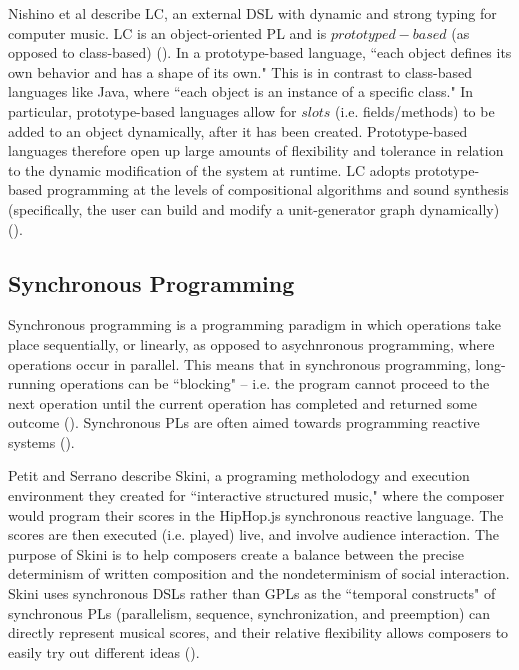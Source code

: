 \documentclass{report}
\newcommand\citeparen[1]{(\cite{#1})}
\begin{document}
Nishino et al describe LC, an  external DSL with dynamic and strong typing for computer music. LC is  an object-oriented PL and is $prototyped-based$ (as opposed  to  class-based) \citeparen{nishino_osaka_nakatsu_2013}. In a prototype-based language, ``each object defines its own behavior and has a shape of its own." This is in contrast to class-based languages like Java, where ``each object is an instance of a specific class." In particular, prototype-based languages allow for $slots$ (i.e. fields/methods)  to be  added  to an  object  dynamically, after it  has been  created. Prototype-based languages therefore open up large amounts of flexibility and tolerance  in relation to the dynamic modification of the system at runtime. LC adopts prototype-based programming at the levels of compositional algorithms  and sound synthesis (specifically, the user can build and modify a unit-generator graph dynamically) \citeparen{nishino_osaka_nakatsu_2014}.

\subsection{Synchronous Programming}
\label{sec:synchronous}
Synchronous  programming is a programming paradigm in which operations take  place  sequentially, or linearly, as opposed to asychnronous programming,  where operations  occur in parallel. This means that in synchronous programming, long-running operations can be ``blocking" -- i.e. the program cannot proceed to the next operation until the current operation has completed and returned some outcome \citeparen{deepsource}. Synchronous PLs are often aimed towards programming reactive systems \citeparen{petit_serrano_2020}.

Petit and Serrano describe Skini, a programing metholodogy and execution environment  they created  for ``interactive structured music," where the composer would  program their scores in the HipHop.js synchronous reactive  language. The scores are then executed (i.e.  played) live, and  involve audience interaction. The purpose of Skini is to help composers create  a balance  between the  precise determinism of written composition and the nondeterminism of social interaction. Skini uses synchronous DSLs rather than GPLs as the ``temporal constructs" of synchronous PLs (parallelism, sequence, synchronization, and preemption) can directly represent musical scores, and their relative flexibility allows  composers to easily try  out different ideas \citeparen{petit_serrano_2020}.
\end{document}
